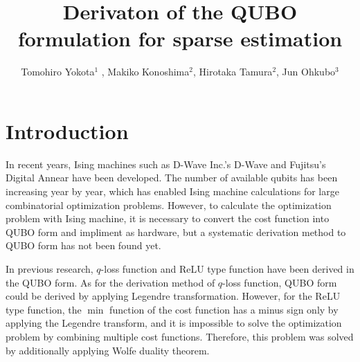 \documentclass[fp,twocolumn]{jpsj3}
\title{Derivaton of the QUBO formulation for sparse estimation}
\author{Tomohiro Yokota$^1$%
  , Makiko Konoshima$^2$, Hirotaka Tamura$^2$, Jun Ohkubo$^3$}
\begin{document}
\maketitle

\section{Introduction}
In recent years, Ising machines such as D-Wave Inc.'s D-Wave and Fujitsu's Digital Annear have been developed.
The number of available qubits has been increasing year by year, which has enabled Ising machine calculations for large combinatorial optimization problems.
However, to calculate the optimization problem with Ising machine, it is necessary to convert the cost function into QUBO form and impliment as hardware, but a systematic derivation method to QUBO form has not been found yet.

In previous research, $q$-loss function and ReLU type function have been derived in the QUBO form.
As for the derivation method of $q$-loss function, QUBO form could be derived by applying Legendre transformation.
However, for the ReLU type function, the $\min$ function of the cost function has a minus sign only by applying the Legendre transform, and it is impossible to solve the optimization problem by combining multiple cost functions.
Therefore, this problem was solved by additionally applying Wolfe duality theorem.
\end{document}
